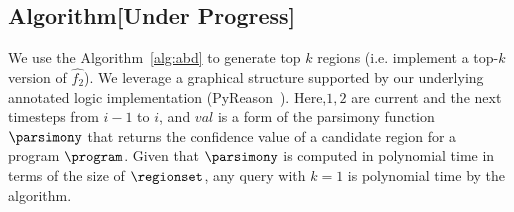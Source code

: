 

\subsection{Algorithm[Under Progress]}

We use the Algorithm~\ref{alg:abd} to generate top $k$ regions (i.e. implement a top-$k$ version of $\hat{f_{2}}$). We leverage a graphical structure supported by our underlying annotated logic implementation (PyReason~\cite{aditya2023pyreason}). Here,$1,2$ are current and the next timesteps from $i-1$ to $i$, and $val$ is a form of the parsimony function $\parsimony$ that returns the confidence value of a candidate region for a program $\program$. Given that $\parsimony$ is computed in polynomial time in terms of the size of $\regionset$, any query with $k=1$ is polynomial time by the algorithm. 

